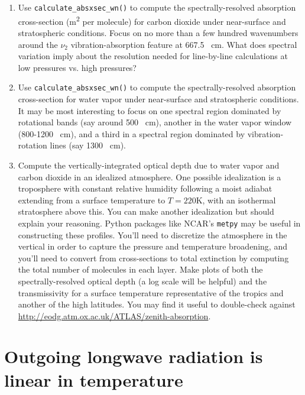 \documentclass{article}
\begin{document}
\begin{enumerate}

\item Use {\tt calculate\_absxsec\_wn()}  to compute the spectrally-resolved absorption cross-section (\si{\square\meter} per molecule) for carbon dioxide under near-surface and stratospheric conditions. Focus on no more than a few hundred wavenumbers around the $\nu_2$ vibration-absorption feature at 667.5 \si{\per\centi\meter}. What does spectral variation imply about the resolution needed for line-by-line calculations at low pressures vs. high pressures? 

\item Use {\tt calculate\_absxsec\_wn()}  to compute the spectrally-resolved absorption cross-section  for water vapor under near-surface and stratospheric conditions. It may be most interesting to focus on one spectral region dominated by rotational bands (say around 500  \si{\per\centi\meter}), another in the water vapor window (800-1200 \si{\per\centi\meter}), and a third in a spectral region dominated by vibration-rotation lines (say 1300  \si{\per\centi\meter}). 

\item Compute the vertically-integrated optical depth due to water vapor and carbon dioxide in an idealized atmosphere. One possible idealization is a troposphere with constant relative humidity following a moist adiabat extending from a surface temperature to $T = 220 \si{\kelvin}$, with an isothermal stratosphere above this. You can make another idealization but should explain your reasoning. Python packages like NCAR's {\tt metpy} may be useful in constructing these profiles. You'll need to discretize the atmosphere in the vertical in order to capture the pressure and temperature broadening, and you'll need to convert from cross-sections to total extinction by computing the total number of molecules in each layer. Make plots of both the spectrally-resolved optical depth (a log scale will be helpful) and the transmissivity for a surface temperature representative of the tropics and another of the high latitudes. You may find it useful to double-check against \url{http://eodg.atm.ox.ac.uk/ATLAS/zenith-absorption}. 

\end{enumerate}
\newpage
\section{Outgoing longwave radiation is linear in temperature}
\end{document}
